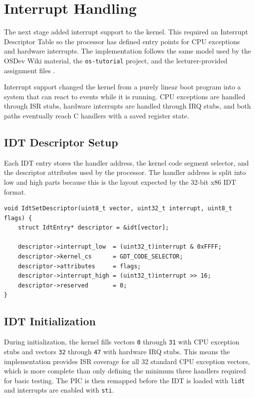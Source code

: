 \newpage

\section{Interrupt Handling}

The next stage added interrupt support to the kernel. This required an Interrupt Descriptor Table so the processor has defined entry points for CPU exceptions and hardware interrupts. The implementation follows the same model used by the OSDev Wiki material, the \texttt{os-tutorial} project, and the lecturer-provided assignment files \cite{osdevInterruptsTutorial,fenollosaOsTutorial,assignmentFiles}.

Interrupt support changed the kernel from a purely linear boot program into a system that can react to events while it is running. CPU exceptions are handled through ISR stubs, hardware interrupts are handled through IRQ stubs, and both paths eventually reach C handlers with a saved register state.

\subsection{IDT Descriptor Setup}
Each IDT entry stores the handler address, the kernel code segment selector, and the descriptor attributes used by the processor. The handler address is split into low and high parts because this is the layout expected by the 32-bit x86 IDT format.

\begin{listing}[H]
\begin{verbatim}
void IdtSetDescriptor(uint8_t vector, uint32_t interrupt, uint8_t flags) {
    struct IdtEntry* descriptor = &idt[vector];

    descriptor->interrupt_low  = (uint32_t)interrupt & 0xFFFF;
    descriptor->kernel_cs      = GDT_CODE_SELECTOR;
    descriptor->attributes     = flags;
    descriptor->interrupt_high = (uint32_t)interrupt >> 16;
    descriptor->reserved       = 0;
}
\end{verbatim}
\caption{Constructing an IDT gate for a specific interrupt vector.}
\end{listing}

\subsection{IDT Initialization}
During initialization, the kernel fills vectors \texttt{0} through \texttt{31} with CPU exception stubs and vectors \texttt{32} through \texttt{47} with hardware IRQ stubs. This means the implementation provides ISR coverage for all 32 standard CPU exception vectors, which is more complete than only defining the minimum three handlers required for basic testing. The PIC is then remapped before the IDT is loaded with \texttt{lidt} and interrupts are enabled with \texttt{sti}.

